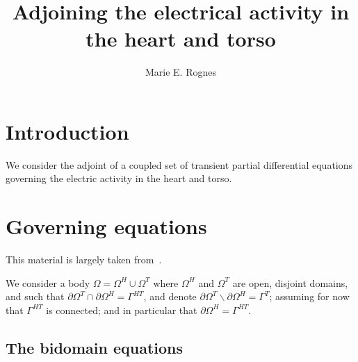 \documentclass[a4paper, reqno]{amsart}
\title{Adjoining the electrical activity in the heart and torso}
\author{Marie E. Rognes}
\numberwithin{equation}{section}
\newcommand{\heart}{\Omega^H}
\newcommand{\torso}{\Omega^T}
\begin{document}
\begin{abstract}
\end{abstract}

\maketitle

\renewcommand{\thefootnote}{\arabic{footnote}}


\section{Introduction}

We consider the adjoint of a coupled set of transient partial
differential equations governing the electric activity in the heart
and torso.

\section{Governing equations}

This material is largely taken from~\cite{book:SundnesEtAl2006}.

We consider a body $\Omega = \heart \cup \torso$ where $\heart$ and
$\torso$ are open, disjoint domains, and such that $\partial \torso
\cap \partial \heart = \Gamma^{HT}$, and denote $\partial \torso
\backslash \partial \heart = \Gamma^T$; assuming for now that
$\Gamma^{HT}$ is connected; and in particular that $\partial \heart =
\Gamma^{HT}$.

\subsection{The bidomain equations}
\end{document}
